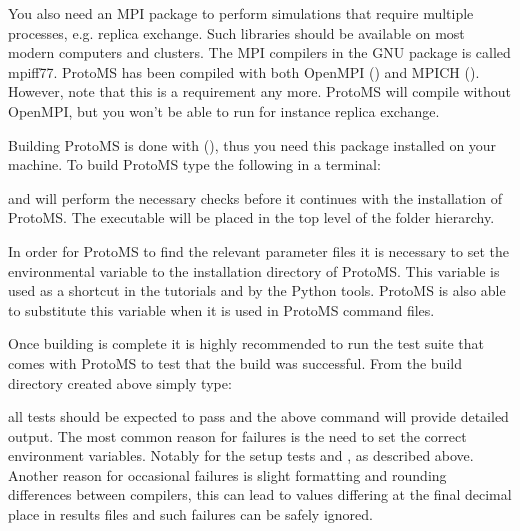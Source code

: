 \documentclass[letterpaper,10pt,english]{sphinxmanual}
\begin{document}
You also need an MPI package to perform simulations that require multiple processes, e.g. replica exchange. Such libraries should be available on most modern computers and clusters. The MPI compilers in the GNU package is called mpiff77. ProtoMS has been compiled with both OpenMPI () and MPICH (). However, note that this is  a requirement any more. ProtoMS will compile without OpenMPI, but you won’t be able to run for instance replica exchange.

Building ProtoMS is done with  (), thus you need this package installed on your machine. To build ProtoMS type the following in a terminal:

%
\begin{sphinxVerbatim}[commandchars=\\\{\}]
 
 
 
 
\end{sphinxVerbatim}

and  will perform the necessary checks before it continues with the installation of ProtoMS. The executable will be placed in the top level of the folder hierarchy.

In order for ProtoMS to find the relevant parameter files it is necessary to set the environmental variable  to the installation directory of ProtoMS. This variable is used as a shortcut in the tutorials and by the Python tools. ProtoMS is also able to substitute this variable when it is used in ProtoMS command files.

Once building is complete it is highly recommended to run the test suite that comes with ProtoMS to test that the build was successful. From the build directory created above simply type:

%
\begin{sphinxVerbatim}[commandchars=\\\{\}]
 
\end{sphinxVerbatim}

all tests should be expected to pass and the above command will provide detailed output. The most common reason for failures is the need to set the correct environment variables. Notably  for the setup tests and , as described above. Another reason for occasional failures is slight formatting and rounding differences between compilers, this can lead to values differing at the final decimal place in results files and such failures can be safely ignored.
\end{document}
